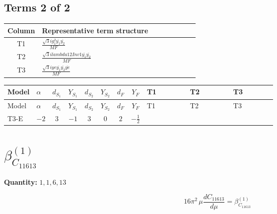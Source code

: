 \documentclass[8pt]{article}
\begin{document}
\begin{landscape}
\subsection*{Terms 2 of 2}
\begin{center}
\begin{tabular}{@{}c >{\raggedright\arraybackslash}p{0.82\linewidth}@{}}
\toprule
Column & Representative term structure \\
\midrule
T1 & \(\displaystyle \frac{\sqrt{3} i g_{1}^{2} \overline{y_{1}} \overline{y_{2}}}{MF}\) \\
\midrule
T2 & \(\displaystyle \frac{\sqrt{3} i lambda12Inv1 \overline{y_{1}} \overline{y_{2}}}{MF}\) \\
\midrule
T3 & \(\displaystyle \frac{\sqrt{3} i ye \overline{y_{1}} \overline{y_{2}} \overline{ye}}{MF}\) \\
\midrule
\bottomrule
\end{tabular}
\end{center}
\smallskip
\tiny
\begin{longtable}{@{}llcccccc >{\raggedright\arraybackslash}p{0.21\linewidth} >{\raggedright\arraybackslash}p{0.21\linewidth} >{\raggedright\arraybackslash}p{0.21\linewidth}@{}}
\toprule
Model & $\alpha$ & $d_{S_1}$ & $Y_{S_1}$ & $d_{S_2}$ & $Y_{S_2}$ & $d_F$ & $Y_F$ & T1 & T2 & T3 \\
\midrule
\endfirsthead
\toprule
Model & $\alpha$ & $d_{S_1}$ & $Y_{S_1}$ & $d_{S_2}$ & $Y_{S_2}$ & $d_F$ & $Y_F$ & T1 & T2 & T3 \\
\midrule
\endhead
T3-E & $-2$ & $3$ & $-1$ & $3$ & $0$ & $2$ & $-\frac{1}{2}$ & \scriptsize\adjustbox{max width=\linewidth}{$\begin{gathered} - \frac{\sqrt{3} i g_{1}^{2} \overline{y_{1}} \overline{y_{2}}}{8 MF}\end{gathered}$} & \scriptsize\adjustbox{max width=\linewidth}{$\begin{gathered} \frac{\sqrt{3} i lambda12Inv1 \overline{y_{1}} \overline{y_{2}}}{6 MF}\end{gathered}$} & \scriptsize\adjustbox{max width=\linewidth}{$\begin{gathered} \frac{\sqrt{3} i ye \overline{y_{1}} \overline{y_{2}} \overline{ye}}{12 MF}\end{gathered}$} \\
\midrule
\bottomrule
\end{longtable}
\clearpage
\section*{$\beta_{C_{11613}}^{(1)}$}
\noindent\textbf{Quantity: }$\mathrm{1,1,6,13}$\par\smallskip
\[16\pi^2\,\mu\frac{d C_{11613}}{d\mu}=\beta_{C_{11613}}^{(1)}\]

\end{landscape}
\end{document}
